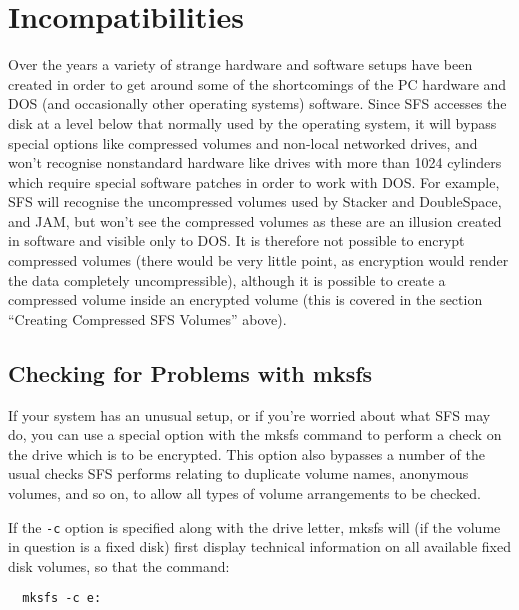 \section{Incompatibilities}

Over the years a variety of strange hardware and software setups have been
created in order to get around some of the shortcomings of the PC hardware and
DOS (and occasionally other operating systems) software.  Since SFS accesses
the disk at a level below that normally used by the operating system, it will
bypass special options like compressed volumes and non-local networked drives,
and won't recognise nonstandard hardware like drives with more than 1024
cylinders which require special software patches in order to work with DOS.  For 
example, SFS will recognise the uncompressed volumes used by Stacker and
DoubleSpace, and JAM, but won't see the compressed volumes as these are an 
illusion created in software and visible only to DOS.  It is therefore not 
possible to encrypt compressed volumes (there would be very little point, as 
encryption would render the data completely uncompressible), although it is 
possible to create a compressed volume inside an encrypted volume (this is 
covered in the section ``Creating Compressed SFS Volumes'' above).


\subsection{Checking for Problems with mksfs}

If your system has an unusual setup, or if you're worried about what SFS may
do, you can use a special option with the mksfs command to perform a check on
the drive which is to be encrypted.  This option also bypasses a number of the
usual checks SFS performs relating to duplicate volume names, anonymous
volumes, and so on, to allow all types of volume arrangements to be checked.

If the {\tt -c} option is specified along with the drive letter, mksfs will (if the
volume in question is a fixed disk) first display technical information on all
available fixed disk volumes, so that the command:

{\tt  \verb|  |mksfs -c e:}

